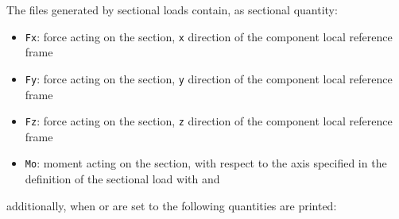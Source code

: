 The files generated by sectional loads contain, as sectional quantity:
\begin{itemize}
    \item \texttt{Fx}: force acting on the section, \texttt{x} direction 
    of the component local reference frame
    \item \texttt{Fy}: force acting on the section, \texttt{y} direction 
    of the component local reference frame
    \item \texttt{Fz}: force acting on the section, \texttt{z} direction 
    of the component local reference frame
    \item \texttt{Mo}: moment acting on the section, with respect to the 
    axis specified in the definition of the sectional load with  
    and 
\end{itemize}
additionally, when  or  
are set to  the following quantities are printed:
